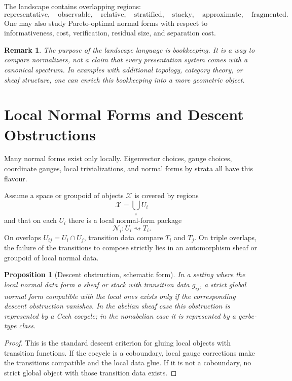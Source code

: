 \documentclass[11pt]{article}
\newtheorem{proposition}[theorem]{Proposition}
\newtheorem{remark}[theorem]{Remark}
\begin{document}
The landscape contains overlapping regions:
\[
\text{representative},\quad
\text{observable},\quad
\text{relative},\quad
\text{stratified},\quad
\text{stacky},\quad
\text{approximate},\quad
\text{fragmented}.
\]
One may also study Pareto-optimal normal forms with respect to informativeness, cost, verification, residual size, and separation cost.

\begin{remark}
The purpose of the landscape language is bookkeeping. It is a way to compare normalizers, not a claim that every presentation system comes with a canonical spectrum. In examples with additional topology, category theory, or sheaf structure, one can enrich this bookkeeping into a more geometric object.
\end{remark}

\section{Local Normal Forms and Descent Obstructions}

Many normal forms exist only locally. Eigenvector choices, gauge choices, coordinate gauges, local trivializations, and normal forms by strata all have this flavour.

Assume a space or groupoid of objects \(\mathcal X\) is covered by regions
\[
\mathcal X=\bigcup_i U_i
\]
and that on each \(U_i\) there is a local normal-form package
\[
\mathcal N_i:U_i\rightsquigarrow T_i.
\]
On overlaps \(U_{ij}=U_i\cap U_j\), transition data compare \(T_i\) and \(T_j\). On triple overlaps, the failure of the transitions to compose strictly lies in an automorphism sheaf or groupoid of local normal data.

\begin{proposition}[Descent obstruction, schematic form]
In a setting where the local normal data form a sheaf or stack with transition data \(g_{ij}\), a strict global normal form compatible with the local ones exists only if the corresponding descent obstruction vanishes. In the abelian sheaf case this obstruction is represented by a Cech cocycle; in the nonabelian case it is represented by a gerbe-type class.
\end{proposition}

\begin{proof}
This is the standard descent criterion for gluing local objects with transition functions. If the cocycle is a coboundary, local gauge corrections make the transitions compatible and the local data glue. If it is not a coboundary, no strict global object with those transition data exists.
\end{proof}
\end{document}
